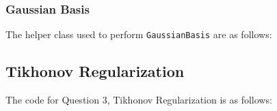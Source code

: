 \documentclass[12pt,a4paper]{article}
\def\tt#1{\texttt{#1}}
\begin{document}
\subsubsection{Gaussian Basis}
The helper class used to perform \tt{GaussianBasis} are as follows:\vspace{-1em}


\subsection{Tikhonov Regularization}
The code for Question 3, Tikhonov Regularization is as follows:\vspace{-1em}

\end{document}
